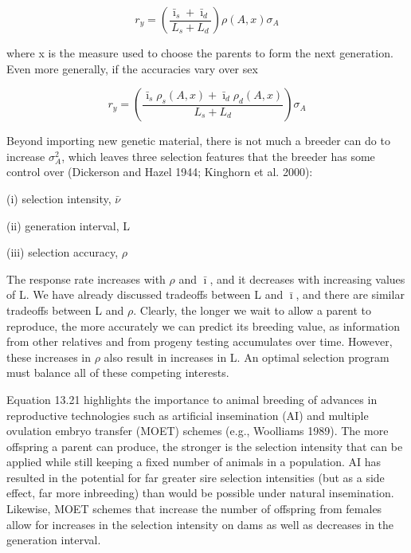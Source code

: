 \documentclass{article}
\begin{document}
\begin{equation}
r_{y}=\left(\frac{\bar{\imath}_{s}+\bar{\imath}_{d}}{L_{s}+L_{d}}\right)\rho(A,x)\sigma_{A}
\tag{13.21a}
\label{eq:13_21a}
\end{equation}

where x is the measure used to choose the parents to form the next generation. Even more generally, if the accuracies vary over sex

\begin{equation}
r_{y}=\left(\frac{\bar{\imath}_{s}\rho_{s}(A,x)+\bar{\imath}_{d}\rho_{d}(A,x)}{L_{s}+L_{d}}\right)\sigma_{A}
\tag{13.21b}
\label{eq:13_21b}
\end{equation}

Beyond importing new genetic material, there is not much a breeder can do to increase  $ \sigma_{A}^{2} $, which leaves three selection features that the breeder has some control over (Dickerson and Hazel 1944; Kinghorn et al. 2000):

(i) selection intensity,  $ \bar{\nu} $

(ii) generation interval, L

(iii) selection accuracy,  $ \rho $

The response rate increases with  $ \rho $ and  $ \bar{\imath} $, and it decreases with increasing values of L. We have already discussed tradeoffs between L and  $ \bar{\imath} $, and there are similar tradeoffs between L and  $ \rho $. Clearly, the longer we wait to allow a parent to reproduce, the more accurately we can predict its breeding value, as information from other relatives and from progeny testing accumulates over time. However, these increases in  $ \rho $ also result in increases in L. An optimal selection program must balance all of these competing interests.

Equation 13.21 highlights the importance to animal breeding of advances in reproductive technologies such as artificial insemination (AI) and multiple ovulation embryo transfer (MOET) schemes (e.g., Woolliams 1989). The more offspring a parent can produce, the stronger is the selection intensity that can be applied while still keeping a fixed number of animals in a population. AI has resulted in the potential for far greater sire selection intensities (but as a side effect, far more inbreeding) than would be possible under natural insemination. Likewise, MOET schemes that increase the number of offspring from females allow for increases in the selection intensity on dams as well as decreases in the generation interval.
\end{document}
